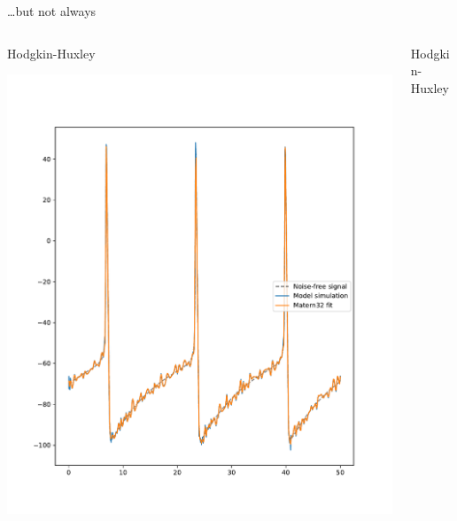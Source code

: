 \documentclass[presentation]{beamer}
\begin{document}
\begin{frame}[plain,label={sec:org91fcb75}]{\ldots{}but not always}
\begin{columns}
\begin{column}{0.5\columnwidth}
\begin{center}
Hodgkin-Huxley
\end{center}

\begin{center}
\includegraphics[width=1.1\textwidth]{./Matern4.pdf}
\end{center}
\end{column}

\begin{column}{0.5\columnwidth}
\begin{center}
Hodgkin-Huxley
\end{center}


\end{column}
\end{columns}
\end{frame}
\end{document}
